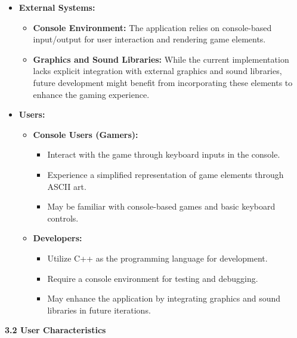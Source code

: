 \documentclass[
]{article}
\begin{document}
\begin{itemize}
\item
  \textbf{External Systems:}

  \begin{itemize}
  \item
    \textbf{Console Environment:} The application relies on
    console-based input/output for user interaction and rendering game
    elements.
  \item
    \textbf{Graphics and Sound Libraries:} While the current
    implementation lacks explicit integration with external graphics and
    sound libraries, future development might benefit from incorporating
    these elements to enhance the gaming experience.
  \end{itemize}
\item
  \textbf{Users:}

  \begin{itemize}
  \item
    \textbf{Console Users (Gamers):}

    \begin{itemize}
    \item
      Interact with the game through keyboard inputs in the console.
    \item
      Experience a simplified representation of game elements through
      ASCII art.
    \item
      May be familiar with console-based games and basic keyboard
      controls.
    \end{itemize}
  \item
    \textbf{Developers:}

    \begin{itemize}
    \item
      Utilize C++ as the programming language for development.
    \item
      Require a console environment for testing and debugging.
    \item
      May enhance the application by integrating graphics and sound
      libraries in future iterations.
    \end{itemize}
  \end{itemize}
\end{itemize}

\textbf{3.2 User Characteristics}
\end{document}
